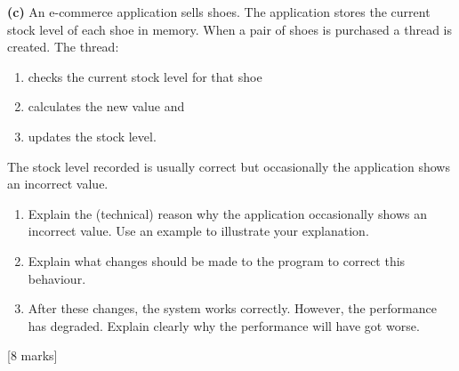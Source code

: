 \textbf{(c)}
An e-commerce application sells shoes. The application stores the current stock level of each shoe in memory. When a pair of shoes is purchased a thread is created. The thread:
\begin{enumerate}
    \item checks the current stock level for that shoe
    \item calculates the new value and
    \item updates the stock level.
\end{enumerate}
The stock level recorded is usually correct but occasionally the application shows an incorrect value.

\begin{enumerate}
    \item[(i)] Explain the (technical) reason why the application occasionally shows an incorrect value. Use an example to illustrate your explanation.
    \item[(ii)] Explain what changes should be made to the program to correct this behaviour.
    \item[(iii)] After these changes, the system works correctly. However, the performance has degraded. Explain clearly why the performance will have got worse.
\end{enumerate}
\hfill [8 marks]
